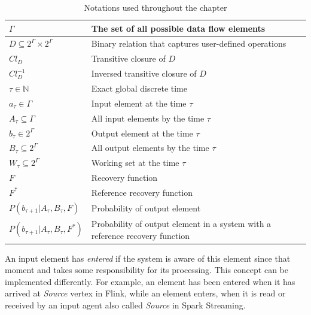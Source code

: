 \begin{table}[!b]
\begin {center}
    \caption{Notations used throughout the chapter}
    \begin{tabular}{l|p{5cm}}
        \hline
        $\Gamma$ & The set of all possible data flow elements \\ 
        \hline
        $D\subseteq{2^{\Gamma}\times2^{\Gamma}}$ & Binary relation that captures user-defined operations  \\
        \hline
        $Cl_D$ & Transitive closure of $D$  \\
        \hline
        $Cl^{-1}_D$ & Inversed transitive closure of $D$  \\
        \hline
        $\tau \in \mathbb{N}$ & Exact global discrete time \\
        \hline
        $a_\tau \in \Gamma$ & Input element at the time $\tau$ \\
        \hline
        $A_\tau \subseteq \Gamma$ & All input elements by the time $\tau$ \\
        \hline
        $b_\tau \in 2^{\Gamma}$ & Output element at the time $\tau$ \\
        \hline
        $B_\tau \subseteq 2^{\Gamma}$ & All output elements by the time $\tau$ \\
        \hline
        $W_\tau \subseteq 2^{\Gamma}$ & Working set at the time $\tau$ \\
        \hline
        $F$ & Recovery function \\
        \hline
        $F^{*}$ & Reference recovery function \\
        \hline
        $P(b_{\tau+1}|A_{\tau}, B_\tau, F)$ & Probability of output element \\
        \hline
        $P(b_{\tau+1}|A_{\tau}, B_\tau, F^{*})$ & Probability of output element in a system with a reference recovery function \\
    \end{tabular}
    \label{notations}
\end {center}
\end{table}

An input element has {\em entered} if the system is aware of this element since that moment and takes some responsibility for its processing. 
This concept can be implemented differently. 
For example,
 an  element has been entered when  it  has arrived at {\em Source} vertex in Flink, while   
an element enters, when it is read or received by an input agent also called  {\em Source}   in Spark Streaming.

